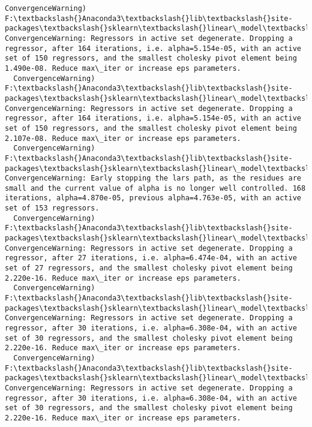 \documentclass[11pt]{article}
\begin{document}
\begin{Verbatim}[commandchars=\\\{\}]
  ConvergenceWarning)
F:\textbackslash{}Anaconda3\textbackslash{}lib\textbackslash{}site-packages\textbackslash{}sklearn\textbackslash{}linear\_model\textbackslash{}least\_angle.py:313: ConvergenceWarning: Regressors in active set degenerate. Dropping a regressor, after 164 iterations, i.e. alpha=5.154e-05, with an active set of 150 regressors, and the smallest cholesky pivot element being 1.490e-08. Reduce max\_iter or increase eps parameters.
  ConvergenceWarning)
F:\textbackslash{}Anaconda3\textbackslash{}lib\textbackslash{}site-packages\textbackslash{}sklearn\textbackslash{}linear\_model\textbackslash{}least\_angle.py:313: ConvergenceWarning: Regressors in active set degenerate. Dropping a regressor, after 164 iterations, i.e. alpha=5.154e-05, with an active set of 150 regressors, and the smallest cholesky pivot element being 2.107e-08. Reduce max\_iter or increase eps parameters.
  ConvergenceWarning)
F:\textbackslash{}Anaconda3\textbackslash{}lib\textbackslash{}site-packages\textbackslash{}sklearn\textbackslash{}linear\_model\textbackslash{}least\_angle.py:339: ConvergenceWarning: Early stopping the lars path, as the residues are small and the current value of alpha is no longer well controlled. 168 iterations, alpha=4.870e-05, previous alpha=4.763e-05, with an active set of 153 regressors.
  ConvergenceWarning)
F:\textbackslash{}Anaconda3\textbackslash{}lib\textbackslash{}site-packages\textbackslash{}sklearn\textbackslash{}linear\_model\textbackslash{}least\_angle.py:313: ConvergenceWarning: Regressors in active set degenerate. Dropping a regressor, after 27 iterations, i.e. alpha=6.474e-04, with an active set of 27 regressors, and the smallest cholesky pivot element being 2.220e-16. Reduce max\_iter or increase eps parameters.
  ConvergenceWarning)
F:\textbackslash{}Anaconda3\textbackslash{}lib\textbackslash{}site-packages\textbackslash{}sklearn\textbackslash{}linear\_model\textbackslash{}least\_angle.py:313: ConvergenceWarning: Regressors in active set degenerate. Dropping a regressor, after 30 iterations, i.e. alpha=6.308e-04, with an active set of 30 regressors, and the smallest cholesky pivot element being 2.220e-16. Reduce max\_iter or increase eps parameters.
  ConvergenceWarning)
F:\textbackslash{}Anaconda3\textbackslash{}lib\textbackslash{}site-packages\textbackslash{}sklearn\textbackslash{}linear\_model\textbackslash{}least\_angle.py:313: ConvergenceWarning: Regressors in active set degenerate. Dropping a regressor, after 30 iterations, i.e. alpha=6.308e-04, with an active set of 30 regressors, and the smallest cholesky pivot element being 2.220e-16. Reduce max\_iter or increase eps parameters.

\end{Verbatim}
\end{document}
